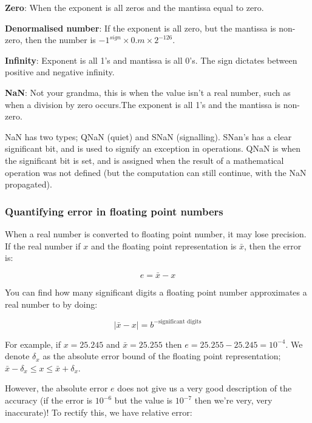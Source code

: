 \begin{description}
\item \textbf{Zero}: When the exponent is all zeros and the mantissa
equal to zero.
\item \textbf{Denormalised number}: If the exponent is all zero, but
the mantissa is non-zero, then the number is $-1^{sign} \times
0.m\times 2^{-126}$.
\item \textbf{Infinity}: Exponent is all 1's and mantissa is all
0's. The sign dictates between positive and negative infinity.
\item \textbf{NaN}: Not your grandma, this is when the value isn't a
  real number, such as when a division by zero occurs.The exponent is
  all 1's and the mantissa is non-zero.

NaN has two types; QNaN (quiet) and SNaN (signalling). SNan's has a
clear significant bit, and is used to signify an exception in
operations. QNaN is when the significant bit is set, and is assigned
when the result of a mathematical operation was not defined (but the
computation can still continue, with the NaN propagated).
\end{description}


\subsubsection{Quantifying error in floating point numbers}

When a real number is converted to floating point number, it may lose precision.
If the real number if $x$ and the floating point representation is
$\bar{x}$, then the error is:

\[
  e = \bar{x} - x
\]

You can find how many significant digits a floating point number approximates a
real number to by doing:

\[
  |\bar{x} - x| = b^{-\text{significant digits}}
\]

For example, if $x = 25.245$ and $\bar{x} = 25.255$ then $e = 25.255 -
25.245 = 10^{-4}$. We denote $\delta_x$ as the absolute error bound of
the floating point representation; $\bar{x} - \delta_x \leq
x \leq \bar{x} + \delta_x$.

However, the absolute error $e$ does not give us a very good description of the
accuracy (if the error is $10^{-6}$ but the value is $10^{-7}$ then we're very,
very inaccurate)! To rectify this, we have relative error:

